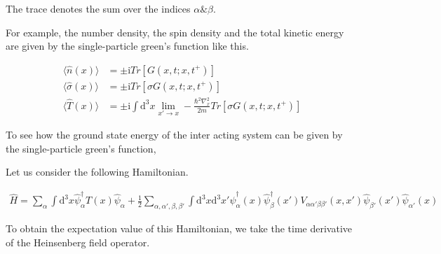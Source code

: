 The trace denotes the sum over the indices $\alpha \& \beta$.

For example, the number density, the spin density and the total kinetic energy are given by the single-particle green's function like this.

\begin{align}
\langle\hat{n}(x)\rangle&=\pm\mathrm{i}Tr[G(x,t;x,t^+)] \nonumber \\
\langle\hat{\sigma}(x)\rangle&=\pm\mathrm{i}Tr[\sigma G(x,t;x,t^+)] \nonumber \\
\langle\hat{T}(x)\rangle&=\pm\mathrm{i}\int \mathrm{d}^3x \lim_{x'\rightarrow x}-\frac{\hbar^2\nabla^2_x}{2m}Tr[\sigma G(x,t;x,t^+)]  \nonumber
\end{align}

To see how the ground  state energy  of the inter acting system can be given by the single-particle green's function,

Let us consider the following Hamiltonian.

\begin{align}\label{2.3.3}
\hat H=\sum_{\alpha}\int \mathrm{d}^3x \hat \psi^{\dagger}_{\alpha}T(x)\hat \psi_{\alpha}+\frac{1}{2}\sum_{\alpha,\alpha',\beta,\beta'}\int \mathrm{d}^3x\mathrm{d}^3x'\hat \psi^{\dagger}_{\alpha}(x)\hat \psi^{\dagger}_{\beta}(x')V_{\alpha\alpha'\beta\beta'}(x,x')\hat \psi_{\beta'}(x')\hat \psi_{\alpha'}(x) 
\end{align}

To obtain the expectation value of this Hamiltonian, we take the time derivative of the Heinsenberg field operator.

